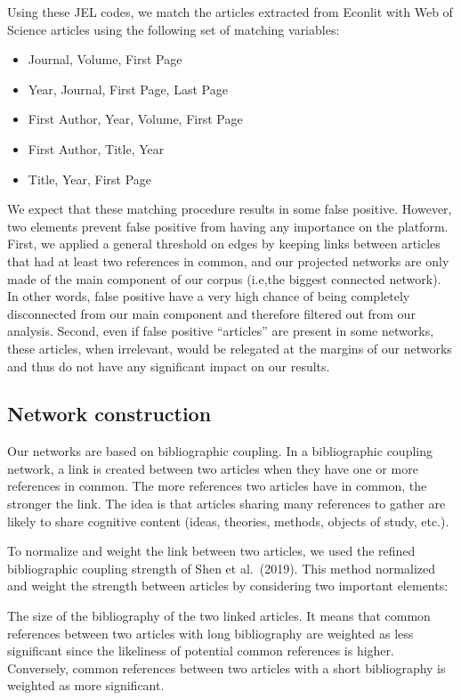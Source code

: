 \documentclass[JEL]{AEA}
\begin{document}
Using these JEL codes, we match the articles extracted from Econlit with
Web of Science articles using the following set of matching variables:

\begin{itemize}
\item
  Journal, Volume, First Page
\item
  Year, Journal, First Page, Last Page
\item
  First Author, Year, Volume, First Page
\item
  First Author, Title, Year
\item
  Title, Year, First Page
\end{itemize}

We expect that these matching procedure results in some false positive.
However, two elements prevent false positive from having any importance
on the platform. First, we applied a general threshold on edges by
keeping links between articles that had at least two references in
common, and our projected networks are only made of the main component
of our corpus (i.e,the biggest connected network). In other words, false
positive have a very high chance of being completely disconnected from
our main component and therefore filtered out from our analysis. Second,
even if false positive ``articles'' are present in some networks, these
articles, when irrelevant, would be relegated at the margins of our
networks and thus do not have any significant impact on our results.

\subsection{Network construction}

Our networks are based on bibliographic coupling. In a bibliographic
coupling network, a link is created between two articles when they have
one or more references in common. The more references two articles have
in common, the stronger the link. The idea is that articles sharing many
references to gather are likely to share cognitive content (ideas,
theories, methods, objects of study, etc.).

To normalize and weight the link between two articles, we used the
refined bibliographic coupling strength of Shen et al.~(2019). This
method normalized and weight the strength between articles by
considering two important elements:

The size of the bibliography of the two linked articles. It means that
common references between two articles with long bibliography are
weighted as less significant since the likeliness of potential common
references is higher. Conversely, common references between two articles
with a short bibliography is weighted as more significant.
\end{document}
